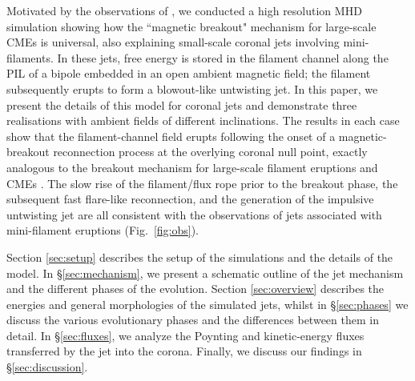 \documentclass[twocolumn]{aastex6}
\begin{document}
Motivated by the observations of \citet{Sterling2015}, we conducted a high resolution MHD simulation \citep{Wyper2017} showing how the ``magnetic breakout" mechanism \citep{Antiochos1999} for large-scale CMEs is universal, also explaining small-scale coronal jets involving mini-filaments. In these jets, free energy is stored in the filament channel along the PIL of a bipole embedded in an open ambient magnetic field; the filament subsequently erupts to form a blowout-like untwisting jet. In this paper, we present the details of this model for coronal jets and demonstrate three realisations with ambient fields of different inclinations. The results in each case show that the filament-channel field erupts following the onset of a magnetic-breakout reconnection process at the overlying coronal null point, exactly analogous to the breakout mechanism for large-scale filament eruptions and CMEs \citep{Antiochos1999,MacNeice2004,Phillips2005,DeVore2008,Lynch2008,Lynch2009,Karpen2012,Masson2013}. The slow rise of the filament/flux rope prior to the breakout phase, the subsequent fast flare-like reconnection, and the generation of the impulsive untwisting jet are all consistent with the observations of jets associated with mini-filament eruptions {(Fig.\ \ref{fig:obs}).}

Section \ref{sec:setup} describes the setup of the simulations and the details of the model. In \S \ref{sec:mechanism}, we present a schematic outline of the jet mechanism and the different phases of the evolution. Section \ref{sec:overview} describes the energies and general morphologies of the simulated jets, whilst in \S \ref{sec:phases} we discuss the various evolutionary phases and the differences between them in detail. In \S \ref{sec:fluxes}, we analyze the Poynting and kinetic-energy fluxes transferred by the jet into the corona. Finally, we discuss our findings in \S \ref{sec:discussion}.
\end{document}
